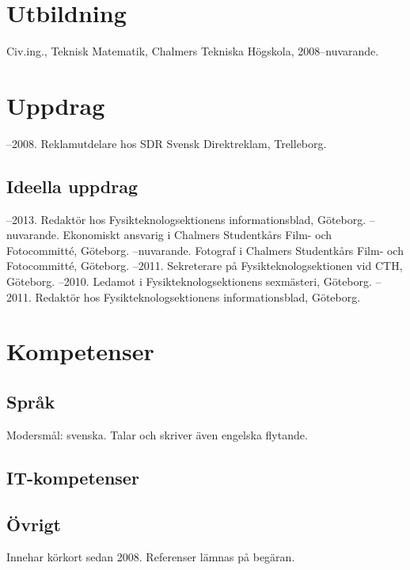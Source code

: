 \documentclass{skvitae}
\author{Simon Sigurdhsson}
\affiliation{}
\begin{document}
	\maketitle

	\section{Utbildning}
	\ind Civ.ing., Teknisk Matematik, Chalmers Tekniska Högskola, 2008--nuvarande.

	\section{Uppdrag}
	--2008. Reklamutdelare hos SDR Svensk Direktreklam, Trelleborg.

	\medskip
	\subsection{Ideella uppdrag}
	--2013. Redaktör hos Fysikteknologsektionens informationsblad, Göteborg.
	--nuvarande. Ekonomiskt ansvarig i Chalmers Studentkårs Film- och Fotocommitté, Göteborg.
	--nuvarande. Fotograf i Chalmers Studentkårs Film- och Fotocommitté, Göteborg.
	--2011. Sekreterare på Fysikteknologsektionen vid CTH, Göteborg.
	--2010. Ledamot i Fysikteknologsektionens sexmästeri, Göteborg.
	--2011. Redaktör hos Fysikteknologsektionens informationsblad, Göteborg.

	\section{Kompetenser}
	\subsection{Språk}
	\ind Modersmål: svenska. Talar och skriver även engelska flytande.

	\medskip
	\subsection{IT-kompetenser}

	\medskip
	\subsection{Övrigt}
	\ind Innehar körkort sedan 2008.
	\ind Referenser lämnas på begäran.
\end{document}
